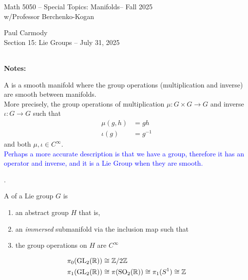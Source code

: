 \documentclass[12pt,a4paper]{report}
\newcommand{\CLASSNAME}{Math 5050 -- Special Topics: Manifolds}
\newcommand{\STUDENTNAME}{Paul Carmody}
\newcommand{\ASSIGNMENT}{Section 15: Lie Groups }
\newcommand{\DUEDATE}{July 31, 2025}
\newcommand{\PROFESSOR}{Professor Berchenko-Kogan}
\newcommand{\SEMESTER}{Fall 2025}
\newcommand{\BLUE}[1]{\textcolor{blue}{#1}}
\begin{document}
\begin{center}
	\Large{\CLASSNAME -- \SEMESTER} \\
	\large{ w/\PROFESSOR}
\end{center}
\begin{center}
	\STUDENTNAME \\
	\ASSIGNMENT -- \DUEDATE\\
\end{center} 

\noindent \textbf{\\\large{Notes:}}
\begin{definition} A  is a smooth manifold where the group operations (multiplication and inverse) are smooth between manifolds.\\

\noindent More precisely, the group operations of multiplication $\mu: G\times G \to G$ and inverse $\iota: G \to G$ such that 
\begin{align*}
	\mu(g,h) &= gh \\
	\iota(g) &= g^{-1}
\end{align*}and both $\mu, \iota \in C^\infty$.\\

\BLUE{Perhaps a more accurate description is that we have a group, therefore it has an operator and inverse, and it is a Lie Group when they are smooth.
}
\end{definition}

\begin{definition}.

A  of a Lie group $G$ is 
\begin{enumerate}[label=(\roman*)]

	\item an abstract group $H$ that is,
	\item an \textit{immersed} submanifold via the inclusion map such that
	\item the group operations on $H$ are $C^\infty$

\end{enumerate}
\end{definition}

\HLINE
\begin{remark}
\newcommand{\GL}{\operatorname{GL}}
\newcommand{\SO}{\operatorname{SO}}
\begin{align*}
	\pi_0(\GL_2(\R)) &\cong \Z/2\Z \\
	\pi_1(\GL_2(\R)) &\cong \pi(\SO_2(\R)) \cong \pi_1(S^1) \cong \Z
\end{align*}
\end{remark}
\end{document}
